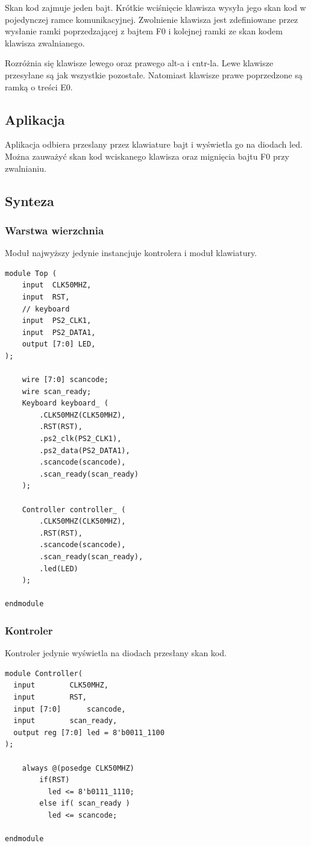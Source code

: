 \documentclass[a4paper,12pt]{article}
\begin{document}
Skan kod zajmuje jeden bajt. Krótkie wciśnięcie klawisza wysyła jego skan kod w pojedynczej ramce komunikacyjnej. Zwolnienie klawisza jest zdefiniowane przez wysłanie ramki poprzedzającej z bajtem F0 i kolejnej ramki ze skan kodem klawisza zwalnianego.

Rozróżnia się klawisze lewego oraz prawego alt-a i cntr-la. Lewe klawisze przesyłane są jak wszystkie pozostałe. Natomiast klawisze prawe poprzedzone są ramką o treści E0.

\subsection{Aplikacja}

Aplikacja odbiera przeslany przez klawiature bajt i wyświetla go na diodach led. Można zauważyć skan kod wciskanego klawisza oraz mignięcia bajtu F0 przy zwalnianiu.

\subsection{Synteza}

\subsubsection{Warstwa wierzchnia}
Moduł najwyższy jedynie instancjuje kontrolera i moduł klawiatury.
\begin{lstlisting}[label=Top,caption=Top.v]
module Top (
    input  CLK50MHZ,
    input  RST,
    // keyboard
    input  PS2_CLK1,
    input  PS2_DATA1,
    output [7:0] LED,
);

    wire [7:0] scancode;
    wire scan_ready;
    Keyboard keyboard_ (
        .CLK50MHZ(CLK50MHZ),
        .RST(RST),
        .ps2_clk(PS2_CLK1),
        .ps2_data(PS2_DATA1),
        .scancode(scancode),
        .scan_ready(scan_ready)
    );

    Controller controller_ (
        .CLK50MHZ(CLK50MHZ),
        .RST(RST),
        .scancode(scancode),
        .scan_ready(scan_ready),
        .led(LED)
    );

endmodule
\end{lstlisting}

\subsubsection{Kontroler}
Kontroler jedynie wyświetla na diodach przesłany skan kod.
\begin{lstlisting}[label=Controller,caption=Controller.v]
module Controller(
  input 	   CLK50MHZ,
  input 	   RST,
  input [7:0] 	   scancode,
  input 	   scan_ready,
  output reg [7:0] led = 8'b0011_1100
);

    always @(posedge CLK50MHZ)
        if(RST)
          led <= 8'b0111_1110;
        else if( scan_ready )
          led <= scancode;

endmodule
\end{lstlisting}
\end{document}

